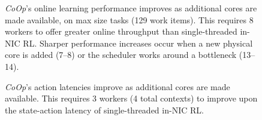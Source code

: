 \documentclass[
sigconf,natbib=false
]{acmart}
\newcommand{\Coopfw}{\emph{CoOp}}
\begin{document}
\begin{figure}
	\caption{
		\Coopfw{}'s online learning performance improves as additional cores are made available, on max size tasks (\num{129} work items). This requires \num{8} workers to offer greater online throughput than single-threaded in-NIC RL. Sharper performance increases occur when a new physical core is added (\numrange{7}{8}) or the scheduler works around a bottleneck (\numrange{13}{14}).\label{fig:vary-core}}
\end{figure}

\begin{figure}
	\caption{\Coopfw{}'s action latencies improve as additional cores are made available. This requires \num{3} workers (4 total contexts) to improve upon the state-action latency of single-threaded in-NIC RL.\label{fig:vary-core-latency}}
\end{figure}
\end{document}
